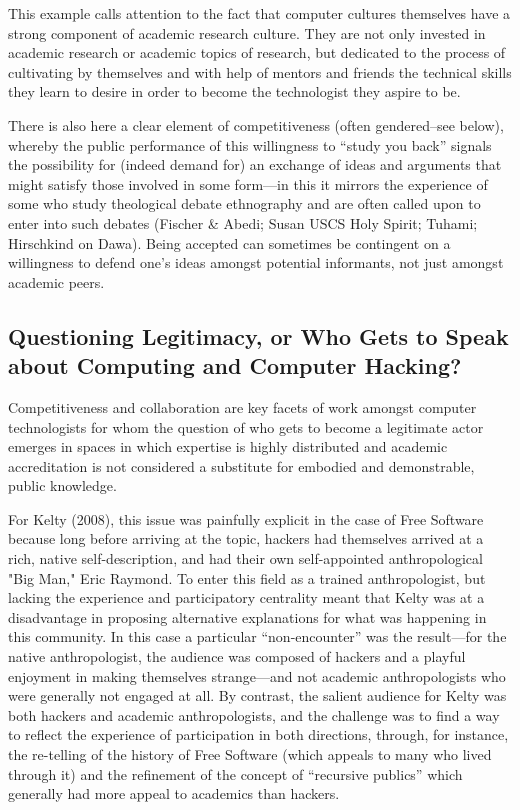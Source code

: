 \documentclass[10pt,letter,oneside]{scrartcl}
\begin{document}
This example calls attention to the fact that computer cultures
themselves have a strong component of academic research culture. They
are not only invested in academic research or academic topics of
research, but dedicated to the process of cultivating by themselves and 
with help of mentors and friends the technical skills they learn to desire
in order to become the technologist they aspire to be. 

There is also here a clear element of competitiveness (often
gendered--see below), whereby the public performance of this
willingness to ``study you back'' signals the possibility for (indeed
demand for) an exchange of ideas and arguments that might satisfy
those involved in some form---in this it mirrors the experience of
some who study theological debate ethnography and are often called
upon to enter into such debates (Fischer \& Abedi; Susan USCS Holy
Spirit; Tuhami; Hirschkind on Dawa).  Being accepted can sometimes be
contingent on a willingness to defend one's ideas amongst potential
informants, not just amongst academic peers.


\subsection{Questioning Legitimacy, or Who Gets to Speak about
    Computing and Computer Hacking?}

Competitiveness and collaboration are key facets of work amongst
computer technologists for whom the question of who gets to become a 
legitimate actor emerges in spaces in which expertise is highly distributed 
and academic accreditation is not considered a substitute for embodied and 
demonstrable, public knowledge.

For Kelty (2008), this issue was painfully explicit in the case of Free
Software because long before arriving at the topic, hackers had
themselves arrived at a rich, native self-description, and had their own
self-appointed anthropological "Big Man," Eric Raymond.  To enter this
field as a trained anthropologist, but lacking the experience and
participatory centrality meant that Kelty was at a disadvantage in
proposing alternative explanations for what was happening in this
community.  In this case a particular ``non-encounter'' was the
result---for the native anthropologist, the audience was
composed of hackers and a playful enjoyment in making themselves
strange---and not academic anthropologists who were generally not
engaged at all.  By contrast, the salient audience for Kelty 
was both hackers and academic anthropologists, and the challenge was 
to find a way to reflect the experience of participation in both directions,
through, for instance, the re-telling of the history of Free Software
(which appeals to many who lived through it) and the refinement of the
concept of ``recursive publics'' which generally had more appeal to
academics than hackers.   
\end{document}
